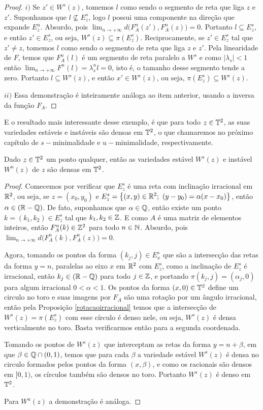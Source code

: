 \begin{proof} $i)$ Se $z'\in W^s(z)$, tomemos $l$ como sendo o segmento de reta que liga $z$ e $z'$. Suponhamos que $l\nsubseteq E^s_z$, logo $l$ possui uma componente na direção que expande $E^u_z$. Absurdo, pois $\lim_{n\to+\infty}d\big(F_A^n(z'),F_A^n(z)\big)=0$. Portanto $l\subseteq E^s_z$, e então $z'\in E^s_z$, ou seja, $W^s(z)\subseteq\pi(E^s_z)$. Reciprocamente, se $z'\in E^s_z$ tal que $z'\neq z$, tomemos $l$ como sendo o segmento de reta que liga $z$ e $z'$. Pela linearidade de $F$, temos que $F_A^n(l)$ é um segmento de reta paralelo a $W^s$ e como $|\lambda_s|<1$ então $\lim_{n\to+\infty}F^n(l)=\lambda_s^nl=0$, isto é, o tamanho desse segmento tende a zero. Portanto $l\subseteq W^s(z)$, e então $x'\in W^s(z)$, ou seja, $\pi(E^s_z)\subseteq W^s(z)$.

$ii)$ Essa demonstração é inteiramente análoga ao item anterior, usando a inversa da função $F_A$.
\end{proof}

E o resultado mais interessante desse exemplo, é que para todo $z\in\mathbb{T}^2$, as suas variedades estáveis e instáveis são densas em $\mathbb{T}^2$, o que chamaremos no próximo capítulo de $s-$minimalidade e $u-$minimalidade, respectivamente.

\begin{proposicao} Dado $z\in\mathbb{T}^2$ um ponto qualquer, então as variedades estável $W^s(z)$ e instável $W^u(z)$ de $z$ são densas em $\mathbb{T}^2$.
\end{proposicao}

\begin{proof} Comecemos por verificar que $E^s_z$ é uma reta com inclinação irracional em $\mathbb{R}^2$, ou seja, se $z=(x_0,y_0)$ e $E^s_z=\conjunto{(x,y)\in \R^2;\ (y-y_0)=\alpha(x-x_0)}$, então $\alpha\in(\mathbb{R}-\mathbb{Q})$. De fato, suponhamos que $\alpha\in\mathbb{Q}$, então existe um ponto $k=(k_1,k_2)\in E^s_z$ tal que $k_1,k_2\in\mathbb{Z}$. E como $A$ é uma matriz de elementos inteiros, então $F_A^n(k)\in\mathbb{Z}^2$ para todo $n\in\mathbb{N}$. Absurdo, pois $\lim_{n\to+\infty}d\big(F_A^n(k),F_A^n(z)\big)=0$. 

Agora, tomando os pontos da forma $(k_j,j)\in E^s_x$ que são a intersecção das retas da forma $y=n$, paralelas ao eixo $x$ em $\mathbb{R}^2$ com $E^s_z$, como a inclinação de $E^s_z$ é irracional, então $k_j\in(\mathbb{R}-\mathbb{Q})$ para todo $j\in\mathbb{Z}$, e portando $\pi(k_j,j)=(\alpha_j,0)$ para algum irracional $0<\alpha<1$. Os pontos da forma $(x,0)\in\mathbb{T}^2$ define um circulo no toro e suas imagens por $F_A$ são uma rotação por um ângulo irracional, então pela Proposição \ref{rotacaoirracional} temos que a intersecção de $W^s(z)=\pi(E^s_z)$ com esse círculo é denso nele, ou seja, $W^s(z)$ é densa verticalmente no toro. Basta verificarmos então para a segunda coordenada.

Tomando os pontos de $W^s(z)$ que interceptam as retas da forma $y=n+\beta$, em que $\beta\in\mathbb{Q}\cap(0,1)$, temos que para cada $\beta$ a variedade estável $W^s(z)$ é densa no circulo formados pelos pontos da forma $(x,\beta)$, e como os racionais são densos em $[0,1)$, os círculos também são densos no toro. Portanto $W^s(z)$ é denso em $\mathbb{T}^2$.

Para $W^u(z)$ a demonstração é análoga.
\end{proof}


